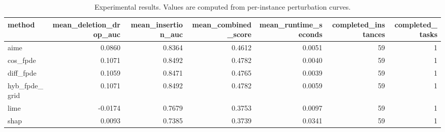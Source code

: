\begin{table}[t]
\caption{Experimental results. Values are computed from per-instance perturbation curves.}
\label{tab:main_results_computed}
\centering
\begin{tabular}{lrrrrrr}
\toprule
method & mean\_deletion\_drop\_auc & mean\_insertion\_auc & mean\_combined\_score & mean\_runtime\_seconds & completed\_instances & completed\_tasks \\
\midrule
aime & 0.0860 & 0.8364 & 0.4612 & 0.0051 & 59 & 1 \\
cos\_fpde & 0.1071 & 0.8492 & 0.4782 & 0.0040 & 59 & 1 \\
diff\_fpde & 0.1059 & 0.8471 & 0.4765 & 0.0039 & 59 & 1 \\
hyb\_fpde\_grid & 0.1071 & 0.8492 & 0.4782 & 0.0059 & 59 & 1 \\
lime & -0.0174 & 0.7679 & 0.3753 & 0.0097 & 59 & 1 \\
shap & 0.0093 & 0.7385 & 0.3739 & 0.0341 & 59 & 1 \\
\bottomrule
\end{tabular}

\end{table}
